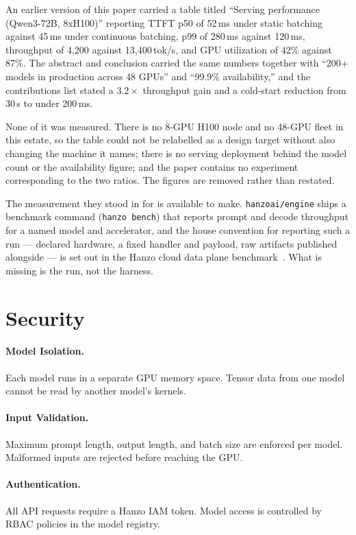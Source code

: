 \documentclass[11pt,twocolumn]{article}
\begin{document}
An earlier version of this paper carried a table titled ``Serving performance
(Qwen3-72B, 8xH100)'' reporting TTFT p50 of 52\,ms under static batching against
45\,ms under continuous batching, p99 of 280\,ms against 120\,ms, throughput of
4{,}200 against 13{,}400\,tok/s, and GPU utilization of 42\% against 87\%. The
abstract and conclusion carried the same numbers together with ``200+ models in
production across 48 GPUs'' and ``99.9\% availability,'' and the contributions
list stated a $3.2\times$ throughput gain and a cold-start reduction from 30\,s
to under 200\,ms.

None of it was measured. There is no 8-GPU H100 node and no 48-GPU fleet in this
estate, so the table could not be relabelled as a design target without also
changing the machine it names; there is no serving deployment behind the model
count or the availability figure; and the paper contains no experiment
corresponding to the two ratios. The figures are removed rather than restated.

The measurement they stood in for is available to make. \texttt{hanzoai/engine}
ships a benchmark command (\texttt{hanzo bench}) that reports prompt and decode
throughput for a named model and accelerator, and the house convention for
reporting such a run --- declared hardware, a fixed handler and payload, raw
artifacts published alongside --- is set out in the Hanzo cloud data plane
benchmark~\cite{clouddataplane}. What is missing is the run, not the harness.

\section{Security}

\paragraph{Model Isolation.} Each model runs in a separate GPU memory space. Tensor data from one model cannot be read by another model's kernels.

\paragraph{Input Validation.} Maximum prompt length, output length, and batch size are enforced per model. Malformed inputs are rejected before reaching the GPU.

\paragraph{Authentication.} All API requests require a Hanzo IAM token. Model access is controlled by RBAC policies in the model registry.
\end{document}
